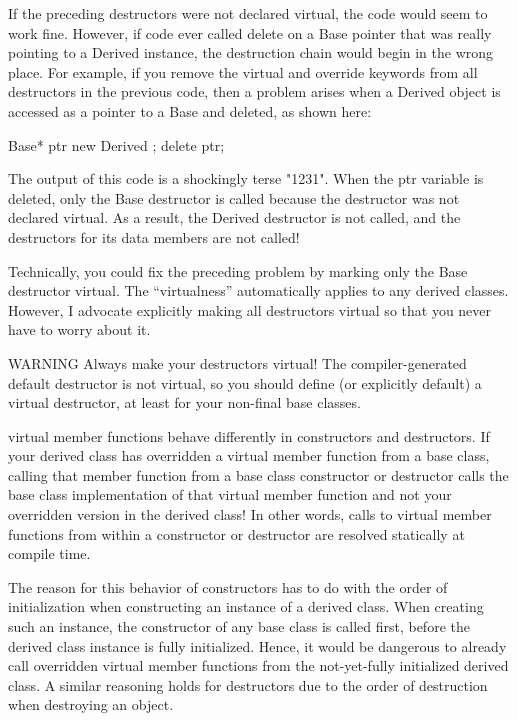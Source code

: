 If the preceding destructors were not declared virtual, the code would seem to work fine. However, if code ever called delete on a Base pointer that was really pointing to a Derived instance, the destruction chain would begin in the wrong place. For example, if you remove the virtual and override keywords from all destructors in the previous code, then a problem arises when a Derived object is accessed as a pointer to a Base and deleted, as shown here:

\begin{cpp}
Base* ptr { new Derived{} };
delete ptr;
\end{cpp}

The output of this code is a shockingly terse "1231". When the ptr variable is deleted, only the Base destructor is called because the destructor was not declared virtual. As a result, the Derived destructor is not called, and the destructors for its data members are not called!

Technically, you could fix the preceding problem by marking only the Base destructor virtual. The “virtualness” automatically applies to any derived classes. However, I advocate explicitly making all destructors virtual so that you never have to worry about it.

\begin{myWarning}{WARNING}
Always make your destructors virtual! The compiler-generated default destructor is not virtual, so you should define (or explicitly default) a virtual destructor, at least for your non-final base classes.
\end{myWarning}


virtual member functions behave differently in constructors and destructors. If your derived class has overridden a virtual member function from a base class, calling that member function from a base class constructor or destructor calls the base class implementation of that virtual member function and not your overridden version in the derived class! In other words, calls to virtual member functions from within a constructor or destructor are resolved statically at compile time.

The reason for this behavior of constructors has to do with the order of initialization when constructing an instance of a derived class. When creating such an instance, the constructor of any base class is called first, before the derived class instance is fully initialized. Hence, it would be dangerous to already call overridden virtual member functions from the not-yet-fully initialized derived class. A similar reasoning holds for destructors due to the order of destruction when destroying an object.

